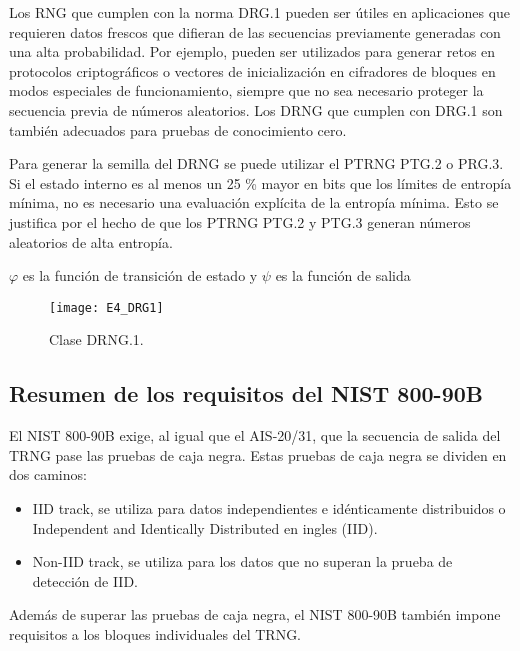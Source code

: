                 Los RNG que cumplen con la norma DRG.1 pueden ser útiles en aplicaciones que requieren datos frescos que difieran de las secuencias previamente generadas con una alta probabilidad. Por ejemplo, pueden ser utilizados para generar retos en protocolos criptográficos o vectores de inicialización en cifradores de bloques en modos especiales de funcionamiento, siempre que no sea necesario proteger la secuencia previa de números aleatorios. Los DRNG que cumplen con DRG.1 son también adecuados para pruebas de conocimiento cero. \cite{AIS2011}

                Para generar la semilla del DRNG se puede utilizar el PTRNG PTG.2 o PRG.3. Si el estado interno es al menos un 25 \% mayor en bits que los límites de entropía mínima, no es necesario una evaluación explícita de la entropía mínima. Esto se justifica por el hecho de que los PTRNG PTG.2 y PTG.3 generan números aleatorios de alta entropía.

                $\varphi$ es la función de transición de estado y $\psi$ es la función de salida

                \begin{figure}[hbtp]
                    \caption{Clase DRNG.1.}
                    \centering
                    \texttt{[image: E4\_DRG1]}
                    \label{fig:E4_DRG1}
                \end{figure}


        \subsection{Resumen de los requisitos del NIST 800-90B}
	
            El NIST 800-90B exige, al igual que el AIS-20/31, que la secuencia de salida del TRNG pase las pruebas de caja negra. Estas pruebas de caja negra se dividen en dos caminos:
            
            \begin{itemize}[noitemsep]
                \item IID track, se utiliza para datos independientes e idénticamente distribuidos o Independent and Identically Distributed en ingles (IID).
                \item Non-IID track, se utiliza para los datos que no superan la prueba de detección de IID.
            \end{itemize}

            Además de superar las pruebas de caja negra, el NIST 800-90B también impone requisitos a los bloques individuales del TRNG.
            
